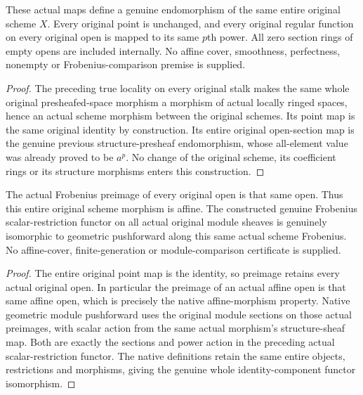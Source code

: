 \begin{theorem}
\label{thm:cartier-original-entire-scheme-frobenius}
\leanok
These actual maps define a genuine endomorphism of the same entire
original scheme $X$. Every original point is unchanged, and every
original regular function on every original open is mapped to its
same $p$th power. All zero section rings of empty opens are included
internally. No affine cover, smoothness, perfectness, nonempty or
Frobenius-comparison premise is supplied.
\end{theorem}
\begin{proof}
The preceding true locality on every original stalk makes the same
whole original presheafed-space morphism a morphism of actual
locally ringed spaces, hence an actual scheme morphism between the
original schemes. Its point map is the same original identity by
construction. Its entire original open-section map is the genuine
previous structure-presheaf endomorphism, whose all-element value
was already proved to be $a^p$. No change of the original scheme,
its coefficient rings or its structure morphisms enters this
construction.
\end{proof}

\begin{theorem}
\label{thm:cartier-original-frobenius-affine-pushforward}
\leanok
The actual Frobenius preimage of every original open is that same
open. Thus this entire original scheme morphism is affine. The
constructed genuine Frobenius scalar-restriction functor
on all actual original module sheaves is genuinely isomorphic to
geometric pushforward along this same actual scheme Frobenius.
No affine-cover, finite-generation or module-comparison certificate
is supplied.
\end{theorem}
\begin{proof}
The entire original point map is the identity, so preimage retains
every actual original open. In particular the preimage of an actual
affine open is that same affine open, which is precisely the native
affine-morphism property. Native geometric module pushforward uses
the original module sections on those actual preimages, with scalar
action from the same actual morphism's structure-sheaf map. Both
are exactly the sections and power action in the preceding actual
scalar-restriction functor. The native definitions retain the same
entire objects, restrictions and morphisms, giving the genuine
whole identity-component functor isomorphism.
\end{proof}

